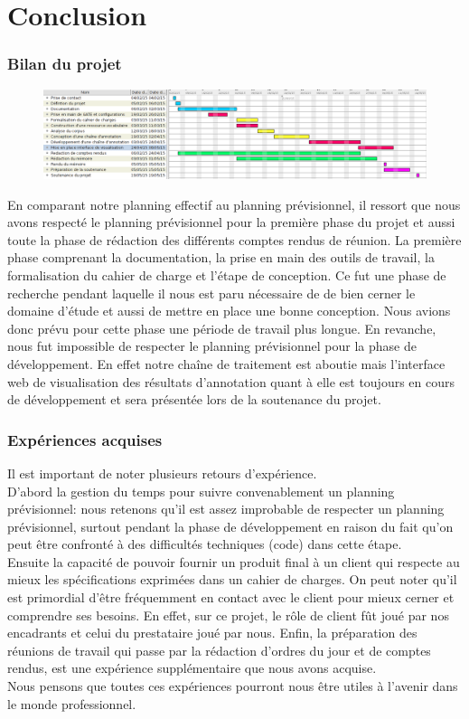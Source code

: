 \documentclass[a4paper, 11pt]{report}
\begin{document}
\part{Conclusion}
\section{Bilan du projet}
\begin{figure}[hbtp]
\includegraphics[scale=.3]{img/ganttEff.png}
\end{figure}
En comparant notre planning effectif au planning prévisionnel, il ressort que nous avons respecté le planning prévisionnel pour la première phase du projet et aussi toute la phase de rédaction des différents comptes rendus de réunion. La première phase comprenant la documentation, la prise en main des outils de travail, la formalisation du cahier de charge et l'étape de conception. Ce fut une phase de recherche pendant laquelle il nous est paru nécessaire de de bien cerner le domaine d'étude et aussi de mettre en place une bonne conception. Nous avions donc prévu pour cette phase une période de travail plus longue. En revanche, nous fut impossible de respecter le planning prévisionnel pour la phase de développement. En effet notre chaîne de traitement est aboutie mais l'interface web de visualisation des résultats d'annotation quant à elle est toujours en cours de développement et sera présentée lors de la soutenance du projet.
\section{Expériences acquises}
Il est important de noter plusieurs retours d'expérience.\\D'abord la gestion du temps pour suivre convenablement un planning prévisionnel: nous retenons qu'il est assez improbable de respecter un planning prévisionnel, surtout pendant la phase de développement en raison du fait qu'on peut être confronté à des difficultés techniques (code) dans cette étape.\\
Ensuite la capacité de pouvoir fournir un produit final à un client qui respecte au mieux les spécifications exprimées dans un cahier de charges. On peut noter qu'il est primordial d'être fréquemment en contact avec le client pour mieux cerner et comprendre ses besoins. En effet, sur ce projet, le rôle de client fût joué par nos encadrants et celui du prestataire joué par nous.
Enfin, la préparation des réunions de travail qui passe par la rédaction d'ordres du jour et de comptes rendus, est une expérience supplémentaire que nous avons acquise.\\
Nous pensons que toutes ces expériences pourront nous être utiles à l'avenir dans le monde professionnel.
\newpage


\end{document}
